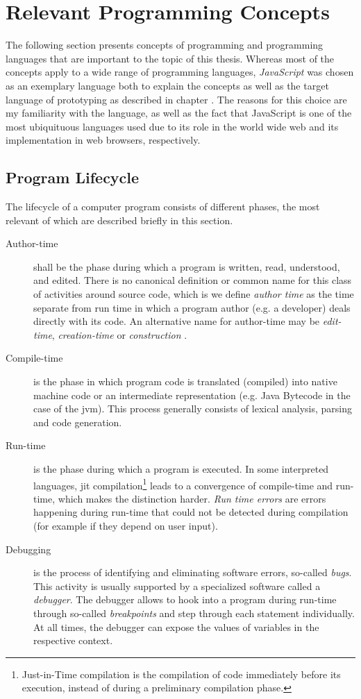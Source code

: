 \section{Relevant Programming
Concepts}\label{relevant-programming-concepts}

The following section presents concepts of programming and programming
languages that are important to the topic of this thesis. Whereas most
of the concepts apply to a wide range of programming languages,
\emph{JavaScript} was chosen as an exemplary language both to explain
the concepts as well as the target language of prototyping as described
in chapter . The reasons for this choice are my
familiarity with the language, as well as the fact that JavaScript is
one of the most ubiquituous languages used due to its role in the world
wide web and its implementation in web browsers, respectively.

\subsection{Program Lifecycle}\label{program-lifecycle}

The lifecycle of a computer program consists of different phases, the
most relevant of which are described briefly in this section.

\begin{description}
\item[Author-time]
shall be the phase during which a program is written, read, understood,
and edited. There is no canonical definition or common name for this
class of activities around source code, which is we define \emph{author
time} as the time separate from run time in which a program author (e.g.
a developer) deals directly with its code. An alternative name for
author-time may be \emph{edit-time}, \emph{creation-time} \cite{getify}
or \emph{construction} \cite{mcconnell}.
\item[Compile-time]
is the phase in which program code is translated (compiled) into native
machine code or an intermediate representation (e.g. Java Bytecode in
the case of the \ac{jvm}). This process generally consists of lexical
analysis, parsing and code generation.
\item[Run-time]
is the phase during which a program is executed. In some interpreted
languages, \ac{jit} compilation\footnote{Just-in-Time compilation is the
  compilation of code immediately before its execution, instead of
  during a preliminary compilation phase.} leads to a convergence of
compile-time and run-time, which makes the distinction harder. \emph{Run
time errors} are errors happening during run-time that could not be
detected during compilation (for example if they depend on user input).
\item[Debugging]
is the process of identifying and eliminating software errors, so-called
\emph{bugs}. This activity is usually supported by a specialized
software called a \emph{debugger}. The debugger allows to hook into a
program during run-time through so-called \emph{breakpoints} and step
through each statement individually. At all times, the debugger can
expose the values of variables in the respective context.
\end{description}

